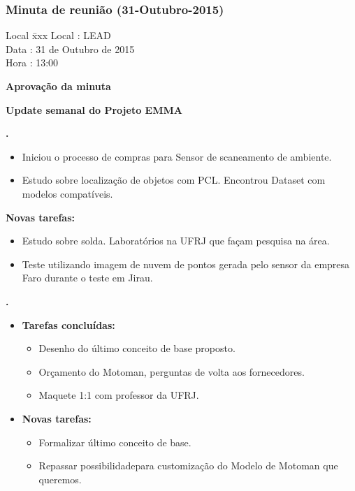 \subsubsection{Minuta de reunião (31-Outubro-2015)}

\begin{tabbing}
  Local \= xxx \kill
  Local \> : LEAD \\
  Data  \> : 31 de Outubro de 2015 \\
  Hora  \> : 13:00
\end{tabbing} 


\textbf{Aprovação da minuta}

\textbf{Update semanal do Projeto EMMA}
   									
						
\textbf{\gabriel.} 
	\begin{itemize}
			\item Iniciou o processo de compras para Sensor de scaneamento de
			ambiente.
			\item Estudo sobre localização de objetos com PCL. Encontrou Dataset com
			modelos compatíveis.
			\end{itemize}
		
		\item \textbf{Novas tarefas:}
			\begin{itemize} 
				\item Estudo sobre solda. Laboratórios na UFRJ que façam pesquisa na
				área.
				\item Teste utilizando imagem de  nuvem de pontos gerada pelo sensor da
				empresa Faro durante o teste em Jirau.
			\end{itemize}

					
			
   \textbf{.} 
	\begin{itemize}
		\item \textbf{Tarefas concluídas:}
			\begin{itemize}    
			    \item Desenho do último conceito de base proposto.
				\item Orçamento do Motoman, perguntas de volta aos fornecedores.
				\item Maquete 1:1 com professor da UFRJ.
				
			\end{itemize}
		
		\item \textbf{Novas tarefas:}
			\begin{itemize} 
			    \item Formalizar último conceito de base.
			    \item Repassar possibilidadepara customização do Modelo de Motoman que
			    queremos.
			\end{itemize}
	\end{itemize}

